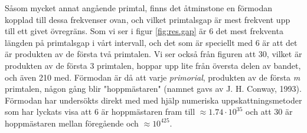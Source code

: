 Såsom mycket annat angående primtal, finns det åtminstone en förmodan kopplad till dessa frekvenser ovan, och vilket primtalsgap är mest frekvent upp till ett givet övregräns. 
Som vi ser i figur \ref{fig:res.gap} är 6 det mest frekventa längden på primtalsgap i vårt intervall, och det som är speciellt med 6 är att det är produkten av de första två primtalen. 
Vi ser också från figuren att 30, vilket är produkten av de första 3 primtalen, hoppar upp lite från översta delen av bandet, och även 210 med. Förmodan är då att varje \textit{primorial}, produkten av de första \textit{m} primtalen, någon gång blir "hoppmästaren" (namnet gavs av J. H. Conway, 1993).
Förmodan har undersökts direkt med med hjälp numeriska uppskattningsmetoder \cite{primeGap} som har lyckats visa att 6 är hoppmästaren fram till \(\approx 1.74\cdot10^{35}\) och att 30 är hoppmästaren mellan föregående och \(\approx 10^{425}\).

